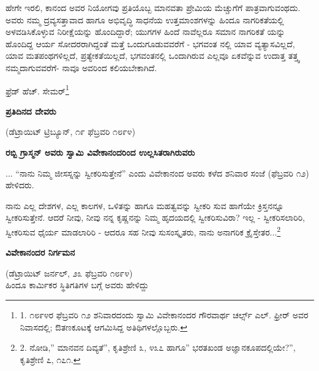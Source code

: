 ಹೇಗೇ ಇರಲಿ, ಕಾನಂದ ಅವರ ನಿಯೋಗವು ಪ್ರತಿಯೊಬ್ಬ ಮಾನವತಾ ಪ್ರೇಮಿಯ ಮೆಚ್ಚುಗೆಗೆ ಪಾತ್ರವಾಗುವಂಥದು. ಅವರು ನಮ್ಮ ದ್ರವ್ಯಸತ್ತಾವಾದ ಹಾಗೂ ಅಭಿವೃದ್ಧಿ ಸಾಧನೆಯ ಉತ್ತಮಾಂಶಗಳನ್ನು ಹಿಂದೂ ನಾಗರಿಕತೆಯಲ್ಲಿ ಅಳವಡಿಸಿಕೊಳ್ಳುವ ನಿರೀಕ್ಷೆಯನ್ನು ಹೊಂದಿದ್ದಾರೆ; ಯುಗಗಳ ಹಿಂದೆ ನಾವೆಲ್ಲರೂ ಸಮಾನ ನಾಗರಿಕತೆ ಯನ್ನು ಹೊಂದಿದ್ದ ಆರ್ಯ ಸೋದರರಾಗಿದ್ದಂತೆ ಮತ್ತೆ ಒಂದುಗೂಡುವವರೆಗೆ - ಭಗವಂತ ನಲ್ಲಿ ಯಾವ ವ್ಯತ್ಯಾಸವಿಲ್ಲದೆ, ಯಾವ ಮತಪಂಥಗಳಿಲ್ಲದೆ, ಪ್ರತ್ಯೇಕತೆಯಿಲ್ಲದೆ, ಭಗವಂತನಲ್ಲಿ ಒಂದಾಗಿರುವ ಎಲ್ಲವೂ ಏಕವೆನ್ನುವ ಉದಾತ್ತ ತತ್ತ್ವ ನಮ್ಮದಾಗುವವರೆಗೆ- ನಾವೂ ಅವರಿಂದ ಕಲಿಯಬೇಕಾಗಿದೆ.

\begin{flushright}
ಫ್ರೆಡ್ ಹೆಚ್. ಸೇಮರ್\footnote{1. ೧೮೯೪ರ ಫೆಬ್ರವರಿ ೧೨ ಶನಿವಾರದಂದು ಸ್ವಾಮಿ ವಿವೇಕಾನಂದರ ಗೌರವಾರ್ಥ ಚರ್ಲ್ಸ್ ಎಲ್. ಫ್ರೀರ್ ಅವರ ನಿವಾಸದಲ್ಲಿ; ಔತಣಕೂಟಕ್ಕೆ ಆಗಮಿಸಿದ್ದ ಅತಿಥಿಗಳಲ್ಲೊಬ್ಬರು.}
\end{flushright}

\begin{center}
\textbf{ಪ್ರತಿದಿನದ ದೇವರು}
\end{center}

\begin{center}
(ಡೆಟ್ರಾಯಿಟ್ ಟ್ರಿಬ್ಯೂನ್, ೧೯ ಫೆಬ್ರವರಿ ೧೮೯೪)
\end{center}

\begin{center}
\textbf{ರಬ್ಬಿ ಗ್ರಾಸ್ಮನ್ ಅವರು ಸ್ವಾಮಿ ವಿವೇಕಾನಂದರಿಂದ ಉಲ್ಲಸಿತರಾಗಿರುವರು}
\end{center}

... “ನಾನು ನಿಮ್ಮ ಜೀಸಸ್ನನ್ನು ಸ್ವೀಕರಿಸುತ್ತೇನೆ” ಎಂದು ವಿವೇಕಾನಂದ ಅವರು ಕಳೆದ ಶನಿವಾರ ಸಂಜೆ (ಫೆಬ್ರವರಿ ೧೨) ಹೇಳಿದರು.

ನಾನು ಎಲ್ಲ ದೇಶಗಳ, ಎಲ್ಲ ಕಾಲಗಳ, ಒಳಿತನ್ನು ಹಾಗೂ ಮಹತ್ವವನ್ನು ಸ್ವೀಕರಿ ಸುವ ಹಾಗೆಯೇ ಕ್ರಿಸ್ತನನ್ನೂ ಸ್ವೀಕರಿಸುತ್ತೇನೆ. ಆದರೆ ನೀವು, ನೀವು ನನ್ನ ಕೃಷ್ಣನನ್ನು ನಿಮ್ಮ ಹೃದಯದಲ್ಲಿ ಸ್ವೀಕರಿಸುವಿರಾ? ಇಲ್ಲ - ಸ್ವೀಕರಿಸಲಾರಿರಿ, ಸ್ವೀಕರಿಸುವ ಧೈರ್ಯ ಮಾಡಲಾರಿರಿ - ಆದರೂ ಸಹ ನೀವು ಸುಸಂಸ್ಕೃತರು, ನಾನು ಅನಾಗರಿಕ ಕ್ರೈಸ್ತೇತರ...\footnote{2. ನೋಡಿ,” ಮಾನವನ ದಿವ್ಯತೆ”, ಕೃತಿಶ್ರೇಣಿ ೩, ೪೩೭ ಹಾಗೂ” ಭರತಖಂಡ ಅಜ್ಞಾನಕೂಪದಲ್ಲಿಯೇ?”, ಕೃತಿಶ್ರೇಣಿ ೭, ೧೭೧.}

\begin{center}
\textbf{ವಿವೇಕಾನಂದರ ನಿರ್ಗಮನ}
\end{center}

\begin{center}
(ಡೆಟ್ರಾಯಿಟ್ ಜರ್ನಲ್, ೨೩ ಫೆಬ್ರವರಿ ೧೮೯೪)\\ಹಿಂದೂ ಕಾರ್ಮಿಕರ ಸ್ಥಿತಿಗತಿಗಳ ಬಗ್ಗೆ ಅವರು ಹೇಳಿದ್ದು
\end{center}

